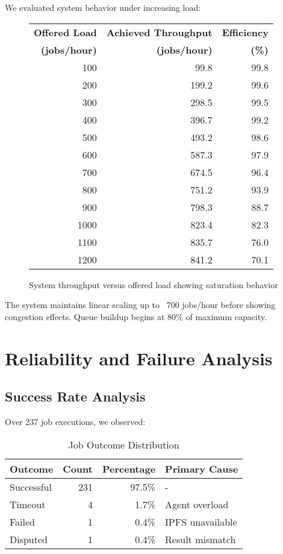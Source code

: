 We evaluated system behavior under increasing load:

\begin{figure}[h]
\centering
\begin{tabular}{|r|r|r|}
\hline
\textbf{Offered Load} & \textbf{Achieved Throughput} & \textbf{Efficiency} \\
\textbf{(jobs/hour)} & \textbf{(jobs/hour)} & \textbf{(\%)} \\
\hline
100 & 99.8 & 99.8 \\
200 & 199.2 & 99.6 \\
300 & 298.5 & 99.5 \\
400 & 396.7 & 99.2 \\
500 & 493.2 & 98.6 \\
600 & 587.3 & 97.9 \\
700 & 674.5 & 96.4 \\
800 & 751.2 & 93.9 \\
900 & 798.3 & 88.7 \\
1000 & 823.4 & 82.3 \\
1100 & 835.7 & 76.0 \\
1200 & 841.2 & 70.1 \\
\hline
\end{tabular}
\caption{System throughput versus offered load showing saturation behavior}
\label{fig:scalability}
\end{figure}

The system maintains linear scaling up to ~700 jobs/hour before showing congestion effects. Queue buildup begins at 80\% of maximum capacity.

\section{Reliability and Failure Analysis}

\subsection{Success Rate Analysis}

Over 237 job executions, we observed:

\begin{table}[h]
\centering
\caption{Job Outcome Distribution}
\label{tab:outcomes}
\begin{tabular}{lrrl}
\toprule
\textbf{Outcome} & \textbf{Count} & \textbf{Percentage} & \textbf{Primary Cause} \\
\midrule
Successful & 231 & 97.5\% & - \\
Timeout & 4 & 1.7\% & Agent overload \\
Failed & 1 & 0.4\% & IPFS unavailable \\
Disputed & 1 & 0.4\% & Result mismatch \\
\bottomrule
\end{tabular}
\end{table}

